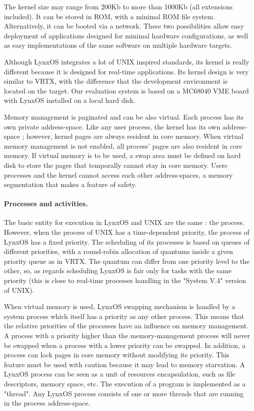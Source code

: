 \documentclass[10pt]{report}
\begin{document}
The kernel size may range from 200Kb to more than 1000Kb (all 
extensions included). It can be stored in ROM, with a minimal ROM
file system. Alternatively, it can be booted via a network. These two
possibilities allow easy deployment of applications designed for minimal 
hardware configurations, as well as easy implementations of the
same software on multiple hardware targets.

Although LynxOS integrates a lot of UNIX inspired standards, its
kernel is really different because it is designed for real-time
applications. Its kernel design is very similar to VRTX, with the
difference that the development environment is located on the
target. Our evaluation system is based on a MC68040 VME board
with LynxOS installed on a local hard disk.

Memory management is paginated and can be also virtual. Each
process has its own private address-space. Like any user
process, the kernel has its own address-space ; however, kernel pages
are always resident in core memory. When virtual memory
management is not enabled, all process' pages are also resident in
core memory. If virtual memory is to be used, a swap area
must be defined on hard disk to store the pages that temporally
cannot stay in core memory. Users processes and the kernel cannot
access each other address-spaces, a memory segmentation that makes a
feature of safety.


\paragraph{Processes and activities.} The basic entity for execution in LynxOS and UNIX are the same : the process. However, when
the process of UNIX has a time-dependent priority, the process of LynxOS has a fixed priority. The scheduling of its processes is
based on queues of different priorities, with a round-robin allocation of quantums inside a given priority queue as in VRTX.
The quantum can differ from one priority level to the other, so, as regards scheduling LynxOS is fair only for tasks with the same
priority (this is close to real-time processes handling in the "System V.4" version of UNIX).

When virtual memory is used, LynxOS swapping mechanism is handled by a system process which itself has a priority
as any other process. This means that the relative priorities of the processes have an influence on memory management. A process with 
a priority higher than the memory-management process will never be swapped when a process with a lower priority can be swapped.
In addition, a process can lock pages in core memory without modifying its priority. This feature must be used with
caution because it may lead to memory starvation. A LynxOS process can be seen as a unit of resources encapsulation, such
as file descriptors, memory space, etc. The execution of a program is implemented as a "thread". Any LynxOS process consists of
one or more threads that are running in the process address-space.
\end{document}
